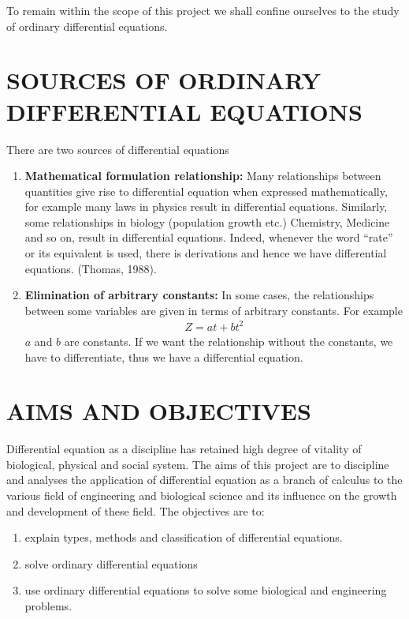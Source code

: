 \documentclass[11pt]{report}
\newcommand{\bt}[1]{\textbf{#1}}
\newcommand{\NI}{\noindent}
\renewcommand{\labelenumi}{\arabic{enumi})}
\begin{document}
	\NI To remain within the scope of this project we shall confine ourselves to the study of ordinary differential equations.
	
	
	\section{SOURCES OF ORDINARY DIFFERENTIAL EQUATIONS}
	There are two sources of differential equations
	\begin{enumerate}
		\item \bt{Mathematical formulation relationship:} Many relationships between quantities give rise to differential equation when expressed mathematically, for example many laws in physics result in differential equations. Similarly, some relationships in biology (population growth etc.) Chemistry, Medicine and so on, result in differential equations. Indeed, whenever the word ``rate'' or its equivalent is used, there is derivations and hence we have differential equations. (Thomas, 1988).
		
		\item \bt{Elimination of arbitrary constants:} In some cases, the relationships between some variables are given in terms of arbitrary constants. For example 
		\begin{eqnarray*}
			Z = at +bt^2
		\end{eqnarray*}
		$a$ and $b$ are constants. If we want the relationship without the constants, we have to differentiate, thus we have a differential equation. 
	\end{enumerate}
	
	\section{AIMS AND OBJECTIVES }	
	Differential equation as a discipline has retained high degree of vitality of biological, physical and social system. The aims of this project are to discipline and analyses the application of differential equation as a branch of calculus to the various field of engineering and biological science and its influence on the growth and development of these field. The objectives are to:
	\begin{enumerate}
		\renewcommand{\labelenumi}{\roman{enumi}.}
		\item explain types, methods and classification of differential equations.
		\item solve ordinary differential equations
		\item use ordinary differential equations to solve some  biological and engineering problems.
	\end{enumerate}	
		
\end{document}
